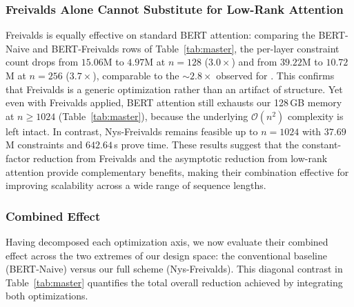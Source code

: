\documentclass[sigconf,anonymous,review,balance=false]{acmart}
\newcommand{\rev}[1]{{\color{magenta}#1}}
\begin{document}
\subsubsection{Freivalds Alone Cannot Substitute for Low-Rank Attention}
\label{subsec:freivalds-not-enough}
Freivalds is equally effective on standard BERT attention: comparing the BERT-Naive and BERT-Freivalds rows of Table~\ref{tab:master}, the per-layer constraint count drops from $15.06$M to $4.97$M at $n{=}128$ ($3.0{\times}$) and from $39.22$M to $10.72$M at $n{=}256$ ($3.7{\times}$), comparable to the ${\sim}2.8{\times}$ observed for \nystrom. This confirms that Freivalds is a generic optimization rather than an artifact of \nystrom structure. Yet even with Freivalds applied, BERT attention still exhausts our 128\,GB memory at $n{\geq}1024$ (Table~\ref{tab:master}), because the underlying $\mathcal{O}(n^2)$ complexity is left intact. In contrast, \rev{Nys-Freivalds} remains feasible up to $n{=}1024$ with $37.69$M constraints and \rev{$642.64$}\,s prove time. These results suggest that the constant-factor reduction from Freivalds and the asymptotic reduction from low-rank attention provide complementary benefits, making their combination effective for improving scalability across a wide range of sequence lengths.
\subsubsection{Combined Effect}
\label{subsec:combined-effect}
Having decomposed each optimization axis, we now evaluate their combined effect across the two extremes of our design space: the conventional baseline (\textsf{BERT-Naive}) versus our full scheme (\textsf{Nys-Freivalds}). This diagonal contrast in Table~\ref{tab:master} quantifies the total overall reduction achieved by integrating both optimizations.
\end{document}
